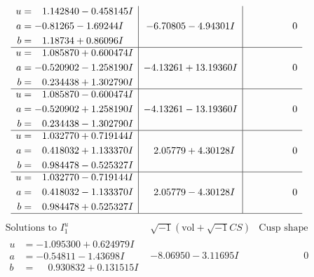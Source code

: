 \documentclass[1p]{elsarticle_modified}
\theoremstyle{definition}
\newcommand{\I}{\sqrt{-1}}
\begin{document}
$$\begin{array}{c|c|c}
\begin{aligned}
u &= \phantom{-}1.142840 - 0.458145 I \\
a &= -0.81265 - 1.69244 I \\
b &= \phantom{-}1.18734 + 0.86096 I\end{aligned}
 & -6.70805 - 4.94301 I & \phantom{-0.000000 } 0 \\ \hline\begin{aligned}
u &= \phantom{-}1.085870 + 0.600474 I \\
a &= -0.520902 - 1.258190 I \\
b &= \phantom{-}0.234438 + 1.302790 I\end{aligned}
 & -4.13261 + 13.19360 I & \phantom{-0.000000 } 0 \\ \hline\begin{aligned}
u &= \phantom{-}1.085870 - 0.600474 I \\
a &= -0.520902 + 1.258190 I \\
b &= \phantom{-}0.234438 - 1.302790 I\end{aligned}
 & -4.13261 - 13.19360 I & \phantom{-0.000000 } 0 \\ \hline\begin{aligned}
u &= \phantom{-}1.032770 + 0.719144 I \\
a &= \phantom{-}0.418032 + 1.133370 I \\
b &= \phantom{-}0.984478 - 0.525327 I\end{aligned}
 & \phantom{-}2.05779 + 4.30128 I & \phantom{-0.000000 } 0 \\ \hline\begin{aligned}
u &= \phantom{-}1.032770 - 0.719144 I \\
a &= \phantom{-}0.418032 - 1.133370 I \\
b &= \phantom{-}0.984478 + 0.525327 I\end{aligned}
 & \phantom{-}2.05779 - 4.30128 I & \phantom{-0.000000 } 0\\
 \hline 
 \end{array}$$\newpage$$\begin{array}{c|c|c}  
\text{Solutions to }I^u_{1}& \I (\text{vol} + \sqrt{-1}CS) & \text{Cusp shape}\\
 \hline 
\begin{aligned}
u &= -1.095300 + 0.624979 I \\
a &= -0.54811 - 1.43698 I \\
b &= \phantom{-}0.930832 + 0.131515 I\end{aligned}
 & -8.06950 - 3.11695 I & \phantom{-0.000000 } 0 \\ \hline\begin{aligned}

\end{aligned}
\end{array}$$
\end{document}
